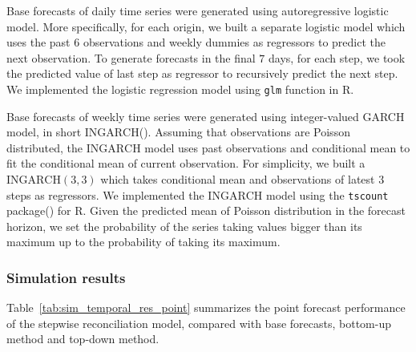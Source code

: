\documentclass[a4paper,review,12pt,authoryear]{elsarticle}
\let\code=\texttt
\let\proglang=\textsf
\begin{document}
Base forecasts of daily time series were generated using autoregressive logistic model. 
More specifically, for each origin, we built a separate logistic model which uses the past $6$ observations and weekly dummies as regressors to predict the next observation. 
To generate forecasts in the final $7$ days, for each step, we took the predicted value of last step as regressor to recursively predict the next step. We implemented the logistic regression model using \code{glm} function in \proglang{R}.

Base forecasts of weekly time series were generated using integer-valued GARCH model, in short $\textrm{INGARCH}$(). 
Assuming that observations are Poisson distributed, the $\textrm{INGARCH}$ model uses past observations and conditional mean to fit the conditional mean of current observation.
For simplicity, we built a $\textrm{INGARCH}(3, 3)$ which takes conditional mean and observations of latest $3$ steps as regressors. 
We implemented the $\textrm{INGARCH}$ model using the \code{tscount} package() for \proglang{R}.
Given the predicted mean of Poisson distribution in the forecast horizon, we set the probability of the series taking values bigger than its maximum up to the probability of taking its maximum.

\subsubsection{Simulation results}

Table~\ref{tab:sim_temporal_res_point} summarizes the point forecast performance of the stepwise reconciliation model, compared with base forecasts, bottom-up method and top-down method.
\end{document}

